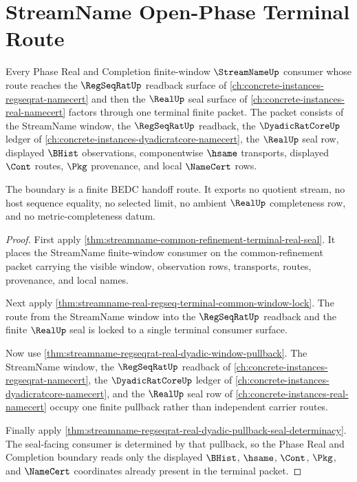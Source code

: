 \section{StreamName Open-Phase Terminal Route}
\label{sec:streamname-open-phase-terminal-route}

\begin{theorem}
\label{thm:streamname-open-phase-terminal-route}
Every Phase Real and Completion finite-window $\StreamNameUp$ consumer whose route reaches the $\RegSeqRatUp$ readback surface of \autoref{ch:concrete-instances-regseqrat-namecert} and then the $\RealUp$ seal surface of \autoref{ch:concrete-instances-real-namecert} factors through one terminal finite packet. The packet consists of the StreamName window, the $\RegSeqRatUp$ readback, the $\DyadicRatCoreUp$ ledger of \autoref{ch:concrete-instances-dyadicratcore-namecert}, the $\RealUp$ seal row, displayed $\BHist$ observations, componentwise $\hsame$ transports, displayed $\Cont$ routes, $\Pkg$ provenance, and local $\NameCert$ rows.

The boundary is a finite BEDC handoff route. It exports no quotient stream, no host sequence equality, no selected limit, no ambient $\RealUp$ completeness row, and no metric-completeness datum.
\end{theorem}
\begin{proof}
First apply \autoref{thm:streamname-common-refinement-terminal-real-seal}. It places the StreamName finite-window consumer on the common-refinement packet carrying the visible window, observation rows, transports, routes, provenance, and local names.

Next apply \autoref{thm:streamname-real-regseq-terminal-common-window-lock}. The route from the StreamName window into the $\RegSeqRatUp$ readback and the finite $\RealUp$ seal is locked to a single terminal consumer surface.

Now use \autoref{thm:streamname-regseqrat-real-dyadic-window-pullback}. The StreamName window, the $\RegSeqRatUp$ readback of \autoref{ch:concrete-instances-regseqrat-namecert}, the $\DyadicRatCoreUp$ ledger of \autoref{ch:concrete-instances-dyadicratcore-namecert}, and the $\RealUp$ seal row of \autoref{ch:concrete-instances-real-namecert} occupy one finite pullback rather than independent carrier routes.

Finally apply \autoref{thm:streamname-regseqrat-real-dyadic-pullback-seal-determinacy}. The seal-facing consumer is determined by that pullback, so the Phase Real and Completion boundary reads only the displayed $\BHist$, $\hsame$, $\Cont$, $\Pkg$, and $\NameCert$ coordinates already present in the terminal packet.
\end{proof}


